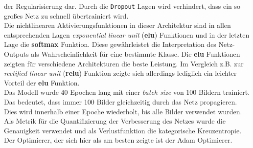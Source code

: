 der Regularisierung dar. Durch die \texttt{Dropout} Lagen wird verhindert,
dass ein so großes Netz zu schnell übertrainiert wird. \\
Die nichtlinearen Aktivierungsfunktionen in dieser Architektur sind in allen
entsprechenden Lagen \textit{exponential linear unit} (\textbf{elu}) Funktionen und in der letzten Lage die
\textbf{softmax} Funktion. Diese gewährleistet die Interpretation des
Netz-Outputs als Wahrscheinlichkeit für eine bestimmte Klasse.
Die \textbf{elu} Funktionen zeigten für verschiedene Architekturen die beste
Leistung. Im Vergleich z.B. zur \textit{rectified linear unit} (\textbf{relu}) Funktion zeigte sich allerdings
lediglich ein leichter Vorteil der \textbf{elu} Funktion.\\
Das Modell wurde 40 Epochen lang mit einer \textit{batch size} von 100 Bildern
trainiert. Das bedeutet, dass immer 100 Bilder gleichzeitig durch das Netz
propagieren. Dies wird innerhalb einer Epoche wiederholt, bis alle Bilder
verwendet wurden. Als Metrik für die Quantifizierung der Verbesserung des
Netzes wurde die Genauigkeit verwendet und als Verlustfunktion die
kategorische Kreuzentropie. Der Optimierer, der sich hier als am besten zeigte
ist der Adam Optimierer.

